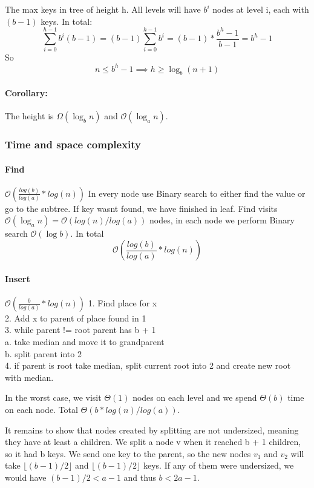 \documentclass[12pt]{article}
\newcommand{\bigO}{\mathcal{O}}
\begin{document}
The max keys in tree of height h. All levels will have $b^i$ nodes at level i, each with $(b - 1)$ keys. In total:
\[ \sum_{i=0}^{h-1} b^i(b-1) = (b-1) \sum_{i=0}^{h-1} b^i = (b-1) * \frac{b^h - 1}{b-1} = b^h - 1 \]
So
\[ n \leq b^h - 1 \implies h \geq \log_b(n + 1) \]

\paragraph{Corollary:} The height is $ \Omega(\log_b n) $ and $ \bigO(\log_a n) $.


\subsubsection{Time and space complexity}

\paragraph{Find} $\bigO(\frac{log(b)}{log(a)}*log(n))$
In every node use Binary search to either find the value or go to the subtree. If key wasnt found, we have finished in leaf.
Find visits $\bigO(\log_a n) = \bigO(log(n)/log(a))$ nodes, in each node we perform Binary search $\bigO(\log b)$.
In total
\[\bigO(\frac{log(b)}{log(a)}*log(n))\]


\paragraph{Insert}  $\bigO(\frac{b}{log(a)}*log(n))$
1. Find place for x \\
2. Add x to parent of place found in 1 \\
3. while parent != root parent has b + 1 \\
	a. take median and move it to grandparent \\
	b. split parent into 2 \\
4. if parent is root take median, split current root into 2 and create new root with median.

In the worst case, we visit $\Theta(1)$ nodes on each level and we spend $\Theta(b)$ time on each node. Total $\Theta(b * log(n)/log(a))$.

It remains to show that nodes created by splitting are not undersized, meaning they have at least a children.
We split a node v when it reached b + 1 children, so it had b keys.
We send one key to the parent, so the new nodes $v_1$ and $v_2$ will take $\lfloor (b - 1)/2 \rfloor$ and $\lfloor (b - 1)/2 \rfloor$ keys.
If any of them were undersized, we would have $(b - 1)/2 < a - 1$ and thus $b < 2a - 1$.
\end{document}
